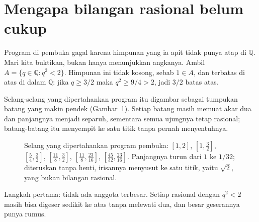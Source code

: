 \section{Mengapa bilangan rasional belum cukup}

Program di pembuka gagal karena himpunan yang ia apit tidak punya atap di
$\mathbb{Q}$. Mari kita buktikan, bukan hanya menunjukkan angkanya. Ambil
$A=\{q\in\mathbb{Q}: q^2<2\}$. Himpunan ini tidak kosong, sebab $1\in A$, dan terbatas
di atas di dalam $\mathbb{Q}$: jika $q\ge 3/2$ maka $q^2\ge 9/4>2$, jadi $3/2$ batas
atas.

Selang-selang yang dipertahankan program itu digambar sebagai tumpukan batang yang makin
pendek (Gambar~\ref{fig:selang-bersarang}). Setiap batang masih memuat akar dua dan
panjangnya menjadi separuh, sementara semua ujungnya tetap rasional; batang-batang itu
menyempit ke satu titik tanpa pernah menyentuhnya.

\begin{figure}[htbp]
\centering
{}
\caption{Selang yang dipertahankan program pembuka: $[1,2]$, $[1,\tfrac32]$,
$[\tfrac54,\tfrac32]$, $[\tfrac{11}{8},\tfrac32]$, $[\tfrac{11}{8},\tfrac{23}{16}]$,
$[\tfrac{45}{32},\tfrac{23}{16}]$. Panjangnya turun dari $1$ ke $1/32$; diteruskan tanpa
henti, irisannya menyusut ke satu titik, yaitu $\sqrt2$, yang bukan bilangan rasional.}
\label{fig:selang-bersarang}
\end{figure}

Langkah pertama: tidak ada anggota terbesar. Setiap rasional dengan $q^2<2$ masih bisa
digeser sedikit ke atas tanpa melewati dua, dan besar geserannya punya rumus.

